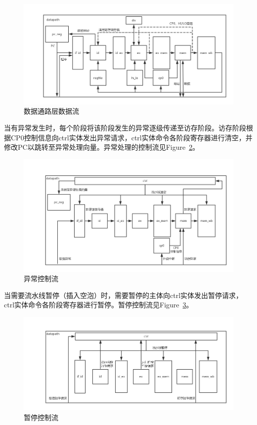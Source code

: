 \documentclass{article}
\begin{document}
\begin{spacing}{1.4}
\begin{figure}[!htb]
	\centering
	\includegraphics[width=\textwidth]{datapath-data-flow.png}
	\caption{数据通路层数据流}
    \label{fig:datapath-data-flow}
\end{figure}

当有异常发生时，每个阶段将该阶段发生的异常逐级传递至访存阶段。访存阶段根据CP0控制信息向ctrl实体发出异常请求，ctrl实体命令各阶段寄存器进行清空，并修改PC以跳转至异常处理向量。异常处理的控制流见Figure~\ref{fig:datapath-exception-flow}。

\begin{figure}[!htb]
	\centering
	\includegraphics[width=\textwidth]{datapath-exception-flow.png}
	\caption{异常控制流}
    \label{fig:datapath-exception-flow}
\end{figure}

当需要流水线暂停（插入空泡）时，需要暂停的主体向ctrl实体发出暂停请求，ctrl实体命令各阶段寄存器进行暂停。暂停控制流见Figure~\ref{fig:datapath-stall-flow}。

\begin{figure}[!htb]
	\centering
	\includegraphics[width=\textwidth]{datapath-stall-flow.png}
	\caption{暂停控制流}
    \label{fig:datapath-stall-flow}
\end{figure}


\end{spacing}
\end{document}

